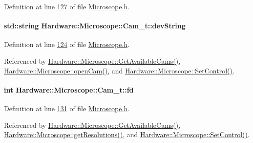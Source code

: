 Definition at line \hyperlink{_microscope_8h_source_l00127}{127} of file \hyperlink{_microscope_8h_source}{Microscope.\+h}.

\hypertarget{struct_hardware_1_1_microscope_1_1_cam__t_ab179002870eff0055f9f61b0bae276aa}{}
\paragraph[{dev\+String}]{\setlength{\rightskip}{0pt plus 5cm}std\+::string Hardware\+::\+Microscope\+::\+Cam\+\_\+t\+::dev\+String}\label{struct_hardware_1_1_microscope_1_1_cam__t_ab179002870eff0055f9f61b0bae276aa}


Definition at line \hyperlink{_microscope_8h_source_l00124}{124} of file \hyperlink{_microscope_8h_source}{Microscope.\+h}.



Referenced by \hyperlink{_microscope_8cpp_source_l00047}{Hardware\+::\+Microscope\+::\+Get\+Available\+Cams()}, \hyperlink{_microscope_8cpp_source_l00167}{Hardware\+::\+Microscope\+::open\+Cam()}, and \hyperlink{_microscope_8cpp_source_l00374}{Hardware\+::\+Microscope\+::\+Set\+Control()}.

\hypertarget{struct_hardware_1_1_microscope_1_1_cam__t_ab8d692f05f97f5f3cc0401f750d9ad2e}{}
\paragraph[{fd}]{\setlength{\rightskip}{0pt plus 5cm}int Hardware\+::\+Microscope\+::\+Cam\+\_\+t\+::fd}\label{struct_hardware_1_1_microscope_1_1_cam__t_ab8d692f05f97f5f3cc0401f750d9ad2e}


Definition at line \hyperlink{_microscope_8h_source_l00131}{131} of file \hyperlink{_microscope_8h_source}{Microscope.\+h}.



Referenced by \hyperlink{_microscope_8cpp_source_l00047}{Hardware\+::\+Microscope\+::\+Get\+Available\+Cams()}, \hyperlink{_microscope_8cpp_source_l00123}{Hardware\+::\+Microscope\+::get\+Resolutions()}, and \hyperlink{_microscope_8cpp_source_l00374}{Hardware\+::\+Microscope\+::\+Set\+Control()}.

